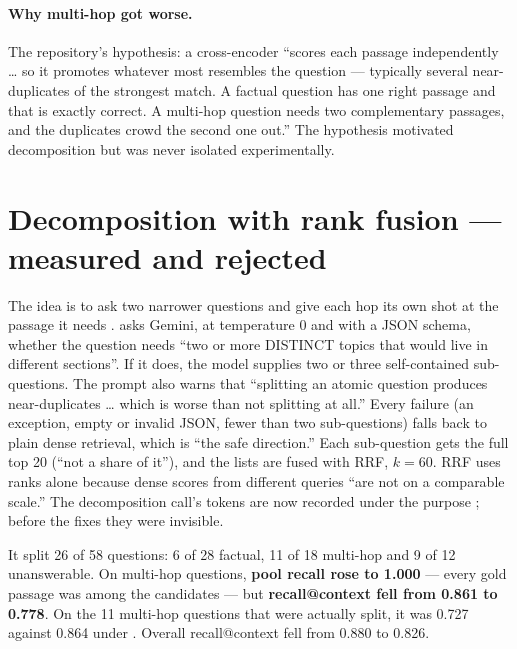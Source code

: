 \paragraph{Why multi-hop got worse.} The repository's hypothesis: a cross-encoder ``scores each passage independently \ldots{} so it promotes whatever most resembles the question --- typically several near-duplicates of the strongest match. A factual question has one right passage and that is exactly correct. A multi-hop question needs two complementary passages, and the duplicates crowd the second one out.'' The hypothesis motivated decomposition but was never isolated experimentally.

\section{Decomposition with rank fusion --- measured and rejected}
\label{sec:decompose}

The idea is to ask two narrower questions and give each hop its own shot at the passage it needs .  asks Gemini, at temperature 0 and with a JSON schema, whether the question needs ``two or more DISTINCT topics that would live in different sections''. If it does, the model supplies two or three self-contained sub-questions. The prompt also warns that ``splitting an atomic question produces near-duplicates \ldots{} which is worse than not splitting at all.'' Every failure (an exception, empty or invalid JSON, fewer than two sub-questions) falls back to plain dense retrieval, which is ``the safe direction.'' Each sub-question gets the full top 20 (``not a share of it''), and the lists are fused with RRF, $k=60$. RRF uses ranks alone because dense scores from different queries ``are not on a comparable scale.'' The decomposition call's tokens are now recorded under the purpose ; before the fixes they were invisible.

\begin{verified}
It split 26 of 58 questions: 6 of 28 factual, 11 of 18 multi-hop and 9 of 12 unanswerable. On multi-hop questions, \textbf{pool recall rose to 1.000} --- every gold passage was among the candidates --- but \textbf{recall@context fell from 0.861 to 0.778}. On the 11 multi-hop questions that were actually split, it was 0.727 against 0.864 under . Overall recall@context fell from 0.880 to 0.826.
\end{verified}

